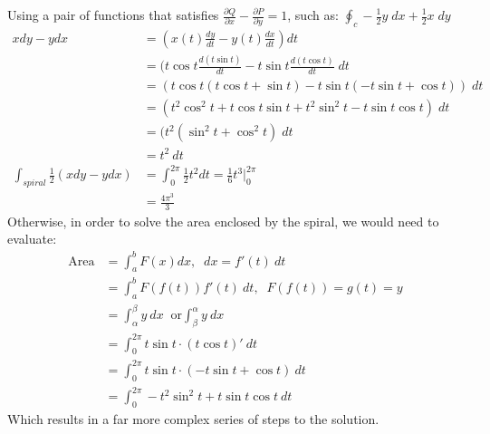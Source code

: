 \documentclass[11pt,English]{article}
\begin{document}
Using a pair of functions that satisfies $\frac{\partial Q}{\partial x} - \frac{\partial P}{\partial y} = 1$, such as: $\oint_{c}-\frac{1}{2}y \; dx+\frac{1}{2}x \; dy $
\begin{align*}
    xdy-ydx &= (x(t)\frac{dy}{dt}-y(t)\frac{dx}{dt})dt \\
    &= (t\cos{t}\frac{d(t\sin{t})}{dt}-t\sin{t}\frac{d(t\cos{t})}{dt}\;dt \\
    &= (t\cos{t}(t\cos{t}+\sin{t})-t\sin{t}(-t\sin{t}+\cos{t}))\;dt \\
    &= (t^2\cos^2{t}+t\cos{t}\sin{t}+t^2\sin^2{t}-t\sin{t}\cos{t})\;dt\\
    &= (t^2(\sin^2{t}+\cos^2{t})\;dt \\
    &= t^2\:dt \\
    \int_{spiral}\frac{1}{2}(xdy-ydx) &= \int^{2\pi}_{0}\frac{1}{2}t^2dt = \frac{1}{6}t^3\Big|^{2\pi}_{0} \\
    &= \frac{4\pi^3}{3}
\end{align*}
Otherwise, in order to solve the area enclosed by the spiral, we would need to evaluate:
\begin{align*}
    \text{Area} &= \int^{b}_{a}F(x)dx,\;\; dx = f'(t)\:dt \\
    &= \int^{b}_{a}F(f(t))f'(t)\:dt, \;\; F(f(t)) = g(t) = y \\
    &= \int^{\beta}_{\alpha}y\:dx\;\; \text{or} \int^{\alpha}_{\beta}y\:dx\\
    &= \int^{2\pi}_{0} t\sin{t}\cdot (t\cos{t})'\:dt \\
    &= \int^{2\pi}_{0}t\sin{t}\cdot (-t\sin{t}+\cos{t})\:dt \\
    &= \int^{2\pi}_{0} -t^{2}\sin^{2}{t}+t\sin{t}\cos{t}\:dt
\end{align*}
Which results in a far more complex series of steps to the solution.
\end{document}
